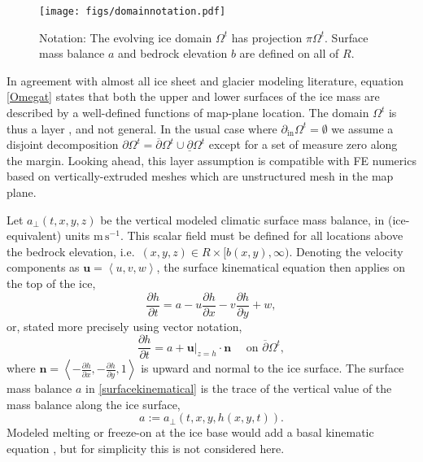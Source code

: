 \documentclass[letterpaper,final,12pt,reqno]{amsart}
\newcommand{\bn}{\mathbf{n}}
\newcommand{\bu}{\mathbf{u}}
\begin{document}
\begin{figure}[h]
\begin{center}
\texttt{[image: figs/domainnotation.pdf]}
\end{center}
\caption{Notation: The evolving ice domain $\Omega^t$ has projection $\pi \Omega^t$.  Surface mass balance $a$ and bedrock elevation $b$ are defined on all of $R$.}
\label{fig:domainnotation}
\end{figure}

In agreement with almost all ice sheet and glacier modeling literature, equation \eqref{Omegat} states that both the upper and lower surfaces of the ice mass are described by a well-defined functions of map-plane location.  The domain $\Omega^t$ is thus a layer \cite{Bueler2020}, and not general.  In the usual case where $\partial_{\text{in}} \Omega^t=\emptyset$ we assume a disjoint decomposition $\partial \Omega^t = \overline{\partial} \Omega^t \cup \underline{\partial} \Omega^t$ except for a set of measure zero along the margin.  Looking ahead, this layer assumption is compatible with FE numerics based on vertically-extruded meshes which are unstructured mesh in the map plane.

Let $a_\perp(t,x,y,z)$ be the vertical modeled climatic surface mass balance, in (ice-equivalent) units $\text{m}\,\text{s}^{-1}$.  This scalar field must be defined for all locations above the bedrock elevation, i.e.~$(x,y,z) \in R\times[b(x,y),\infty)$.  Denoting the velocity components as $\bu=\left<u,v,w\right>$, the surface kinematical equation \cite{GreveBlatter2009} then applies on the top of the ice,
    $$\frac{\partial h}{\partial t} = a - u \frac{\partial h}{\partial x} - v \frac{\partial h}{\partial y} + w,$$
or, stated more precisely using vector notation,
\begin{equation}
\frac{\partial h}{\partial t} = a + \bu|_{z=h} \cdot \bn \quad \text{ on } \overline{\partial}\Omega^t, \label{surfacekinematical}
\end{equation}
where $\bn = \left<-\frac{\partial h}{\partial x},-\frac{\partial h}{\partial y},1\right>$ is upward and normal to the ice surface.  The surface mass balance $a$ in \eqref{surfacekinematical} is the trace \cite{Evans2010} of the vertical value of the mass balance along the ice surface,
    $$a := a_{\perp}(t,x,y,h(x,y,t)).$$
Modeled melting or freeze-on at the ice base would add a basal kinematic equation \cite[for example]{Aschwandenetal2012}, but for simplicity this is not considered here.
\end{document}
